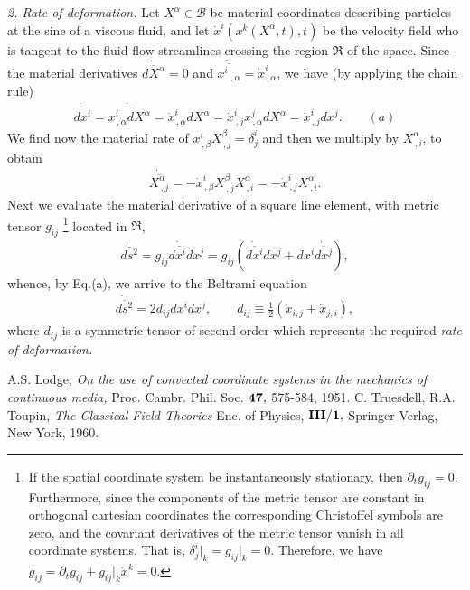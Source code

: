 \documentclass[12pt]{article}
\begin{document}
{{\em 2. Rate of deformation.} Let $X^\alpha\in\mathscr{B}$ be  material coordinates describing particles at the sine of a viscous fluid, and let $\dot{x}^i(x^k(X^\alpha,t),t)$ be the velocity field who is tangent to the fluid flow streamlines crossing the region $\Re$ of the space. Since the material derivatives $\dot{\overline{dX^\alpha}}=0$ and $\dot{\overline{x^i\,_{,\alpha}}}=\dot{x}^i_{\,,\alpha}$, we have (by applying the chain rule)
\begin{align*}
\dot{\overline{dx^i}}=\dot{\overline{x^i_{\,,\alpha}dX^\alpha}}=
\dot{x}^i_{\,,\alpha}dX^\alpha=\dot{x}^i_{\,,j}x^j_{\,,\alpha}d X^\alpha 
=\dot{x}^i_{\,,j}dx^j.  \qquad (a)
\end{align*}
We find now the material rate of $x^i_{\,,\beta}X^\beta_{\,,j}=\delta^i_j$ and then we multiply by $X^\alpha_{\,,i}$, to obtain
\begin{align*}
\dot{\overline{X^\alpha_{\,,j}}}=-\dot{x}^i_{\,,\beta}X^\beta_{\,,j}X^\alpha_{\,,i}=-\dot{x}^i_{\,,j}X^\alpha_{\,,i}.
\end{align*}
Next we evaluate the material derivative of a square line element, with metric tensor $g_{ij}$ {\footnote{If the spatial coordinate system be instantaneously stationary, then $\partial_tg_{ij}=0.$ Furthermore, since the components of the metric tensor are constant in orthogonal cartesian coordinates the corresponding Christoffel symbols are zero, and the covariant derivatives of the metric tensor vanish in all coordinate systems. That is, $\delta^i_j\big|_k=g_{ij}\big|_k=0.$ Therefore, we have $\dot{g}_{ij}=\partial_tg_{ij}+g_{ij}\big|_k\dot{x}^k=0.$}}  located in $\Re$,
\begin{align*}
\dot{\overline{ds^2}}=\dot{\overline{g_{ij}dx^idx^j}}=g_{ij}(\dot{\overline{dx^i}}dx^j+dx^i\dot{\overline{dx^j}}),
\end{align*}
whence, by Eq.(a), we arrive to the Beltrami equation\cite{cite:Beltrami}
\begin{align*}
\dot{\overline{ds^2}}=2d_{ij}dx^idx^j, \qquad d_{ij}\equiv\frac{1}{2}(\dot{x}_{i,j}+\dot{x}_{j,i}),
\end{align*}
where $d_{ij}$  is a symmetric tensor of second order which represents the required {\em rate of deformation.}
\begin{thebibliography}{1}
A.S. Lodge, {\em On the use of convected coordinate systems in the mechanics of continuous media,} Proc. Cambr. Phil. Soc. ${\bf 47,}$  575-584, 1951.
C. Truesdell, R.A. Toupin, {\em The Classical Field Theories} Enc. of Physics, ${\bf III/1,}$  Springer Verlag, New York, 1960.

\end{thebibliography}}
\end{document}
